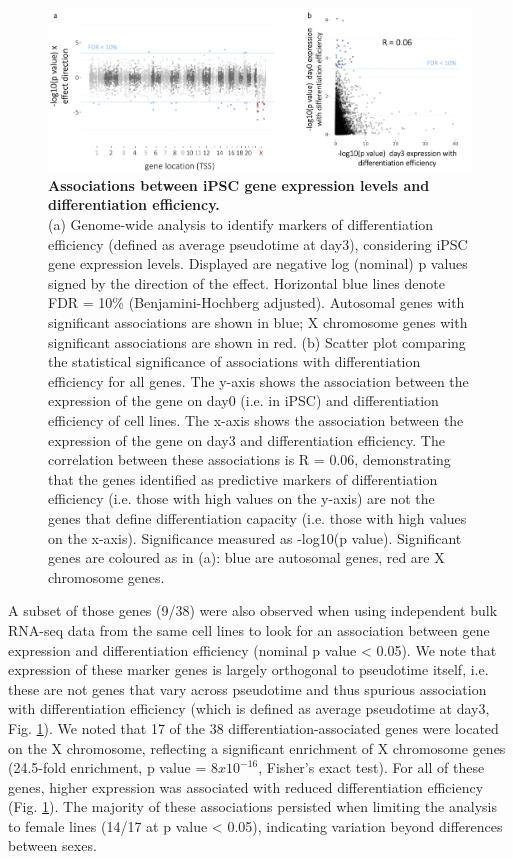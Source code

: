 \begin{figure}[h]
\centering
\includegraphics[width=15.5cm]{Chapter4/Fig/endodiff_diff_eff_manhattan.png}
\caption[Associations between iPSC gene expression levels and differentiation efficiency]{\textbf{Associations between iPSC gene expression levels and differentiation efficiency.}\\
(a) Genome-wide analysis to identify markers of differentiation efficiency (defined as average pseudotime at day3), considering iPSC gene expression levels. 
Displayed are negative log (nominal) p values signed by the direction of the effect. 
Horizontal blue lines denote FDR = 10\% (Benjamini-Hochberg adjusted). 
Autosomal genes with significant associations are shown in blue; X chromosome genes with significant associations are shown in red. 
(b) Scatter plot comparing the statistical significance of associations with differentiation efficiency for all genes. 
The y-axis shows the association between the expression of the gene on day0 (i.e. in iPSC) and differentiation efficiency of cell lines. 
The x-axis shows the association between the expression of the gene on day3 and differentiation efficiency. 
The correlation between these associations is R = 0.06, demonstrating that the genes identified as predictive markers of differentiation efficiency (i.e. those with high values on the y-axis) are not the genes that define differentiation capacity (i.e. those with high values on the x-axis). 
Significance measured as -log10(p value). 
Significant genes are coloured as in (a): blue are autosomal genes, red are X chromosome genes.}
\label{fig:endodiff_manhattan_differentiation}
\end{figure}

A subset of those genes (9/38) were also observed when using independent bulk RNA-seq data from the same cell lines to look for an association between gene expression and differentiation efficiency (nominal p value < 0.05). 
We note that expression of these marker genes is largely orthogonal to pseudotime itself, i.e. these are not genes that vary across pseudotime and thus spurious association with differentiation efficiency (which is defined as average pseudotime at day3, Fig. \ref{fig:endodiff_manhattan_differentiation}). 
We noted that 17 of the 38 differentiation-associated genes were located on the X chromosome, reflecting a significant enrichment of X chromosome genes (24.5-fold enrichment, p value = $8x10^{-16}$, Fisher’s exact test). 
For all of these genes, higher expression was associated with reduced differentiation efficiency (Fig. \ref{fig:endodiff_manhattan_differentiation}). 
The majority of these associations persisted when limiting the analysis to female lines (14/17 at p value < 0.05), indicating variation beyond differences between sexes. 

